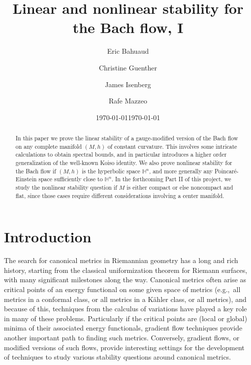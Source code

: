 \documentclass[10pt,reqno]{amsart}
\begin{document}
\title[Bach flow]{Linear and nonlinear stability for the Bach flow, I} 

\author[Bahuaud]{Eric Bahuaud}
\address{Department of Mathematics,
	Seattle University,
	Seattle, WA, 98122, USA}
\author[Guenther]{Christine Guenther}
\address{Department of Mathematics,
	Pacific University,
	Forest Grove, OR 97116, USA}
\author[Isenberg]{James Isenberg}
\address{Department of Mathematics,
	University of Oregon,
	Eugene, OR 97403-1222 USA}
\author[Mazzeo]{Rafe Mazzeo}
\address{Department of Mathematics, Stanford University, Stanford, CA}

\date{\today}
\date{\today}

\begin{abstract}
In this paper we prove the linear stability of a gauge-modified version of the Bach flow on any complete manifold $(M, h)$ of
constant curvature. This involves some intricate calculations to obtain spectral bounds, and in particular introduces a higher order generalization
of the well-known Koiso identity.  We also prove nonlinear stability for the Bach flow if $(M, h)$ is the hyperbolic space $\mathbb H^n$, and more generally 
any Poincar\'e-Einstein space sufficiently close to $\mathbb H^n$.
In the forthcoming Part II of this project, we study the nonlinear stability question if $M$ is either compact or else noncompact and flat, since
those cases require different considerations involving a center manifold.
\end{abstract}

\maketitle

\section{Introduction}
The search for canonical metrics in Riemannian geometry has a long and rich history, starting from the classical uniformization theorem
for Riemann surfaces, with many significant milestones along the way.  Canonical metrics often arise as critical points
of an energy functional on some given space of metrics (e.g.,\ all metrics in a conformal class, or all metrics in a K\"ahler class, or
all metrics), and because of this, techniques from the calculus of variations have played a key role in many of these problems.
Particularly if the critical points are (local or global) minima of their associated energy functionals, gradient flow techniques 
provide another important path to finding such metrics.  Conversely, gradient flows, or modified versions of such flows, provide interesting
settings for the development of techniques to study various stability questions around canonical metrics. 
\end{document}
